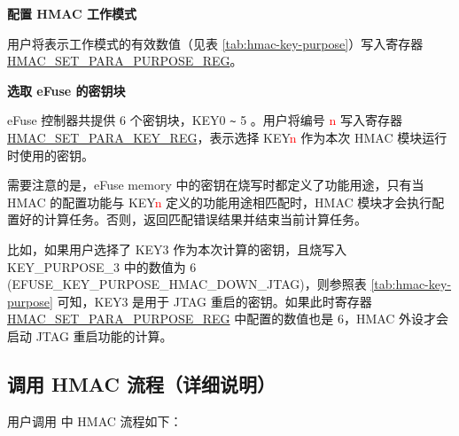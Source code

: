 \documentclass[main\_\_CN.tex]{subfiles}
\begin{document}
\textbf{配置 HMAC 工作模式}

用户将表示工作模式的有效数值（见表 \ref{tab:hmac-key-purpose}）写入寄存器 \hyperref[regdesc:HMACSETPARAPURPOSEREG]{HMAC\_SET\_PARA\_PURPOSE\_REG}。

\textbf{选取 eFuse 的密钥块}

\label{sec:hmac-config-efuse-key}
eFuse 控制器共提供 6 个密钥块，KEY0 \verb+~+ 5 。用户将编号 \textcolor{red}{n} 写入寄存器 \hyperref[regdesc:HMACSETPARAKEYREG]{HMAC\_SET\_PARA\_KEY\_REG}，表示选择 KEY\textcolor{red}{n} 作为本次 HMAC 模块运行时使用的密钥。

需要注意的是，eFuse memory 中的密钥在烧写时都定义了功能用途，只有当 HMAC 的配置功能与 KEY\textcolor{red}{n} 定义的功能用途相匹配时，HMAC 模块才会执行配置好的计算任务。否则，返回匹配错误结果并结束当前计算任务。

比如，如果用户选择了 KEY3 作为本次计算的密钥，且烧写入 KEY\_PURPOSE\_3 中的数值为 6\\ (EFUSE\_KEY\_PURPOSE\_HMAC\_DOWN\_JTAG)，则参照表 \ref{tab:hmac-key-purpose} 可知，KEY3 是用于 JTAG 重启的密钥。如果此时寄存器 \hyperref[regdesc:HMACSETPARAPURPOSEREG]{HMAC\_SET\_PARA\_PURPOSE\_REG} 中配置的数值也是 6，HMAC 外设才会启动 JTAG 重启功能的计算。


\subsection{调用 HMAC 流程（详细说明）}
\label{sec:hmac-process-detailed}
用户调用 \chipname{} 中 HMAC 流程如下：
\end{document}
